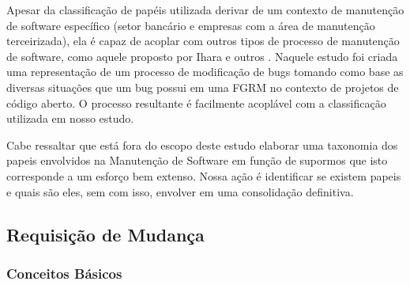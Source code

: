 Apesar da classificação de papéis utilizada derivar de um contexto de manutenção
de software específico (setor bancário e empresas com a área de manutenção
terceirizada), ela é capaz de acoplar com outros tipos de processo de manutenção
de software, como aquele proposto por Ihara e outros
\cite{Ihara:2009:AMI:1595808.1595833}. Naquele estudo foi criada uma
representação de um processo de modificação de bugs tomando como base as
diversas situações que um bug possui em uma FGRM no contexto de projetos de
código aberto. O processo resultante é facilmente acoplável com a classificação
utilizada em nosso estudo.

Cabe ressaltar que está fora do escopo deste estudo elaborar uma taxonomia dos
papeis envolvidos na Manutenção de Software em função de supormos que isto
corresponde a um esforço bem extenso. Nossa ação é identificar se existem papeis
e quais são eles, sem com isso, envolver em uma consolidação definitiva.
\todoend

\subsection{Requisição de Mudança}
\label{sec:requisicao_de_mudanca}

\subsubsection{Conceitos Básicos}
\label{subsec:tipos_de_requisicoes_mudanca}




